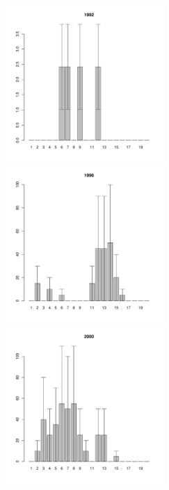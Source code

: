 \documentclass[12pt, a4paper]{article}
\begin{document}
\begin{figure}[h]

\begin{multicols}{3}
\hfill
\includegraphics[width=60mm]{../White_Sea/Luvenga_Goreliy/low_1992_.pdf}
\hfill
\includegraphics[width=60mm]{../White_Sea/Luvenga_Goreliy/low_1996_.pdf}
\hfill
\includegraphics[width=60mm]{../White_Sea/Luvenga_Goreliy/low_2000_.pdf}
\end{multicols}




\end{figure}
\end{document}
